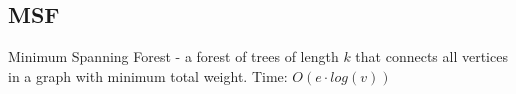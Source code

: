 \subsection{MSF}

Minimum Spanning Forest - a forest of trees of length $k$ that connects all vertices in a graph with minimum total weight.
Time: $O(e \cdot log(v))$
